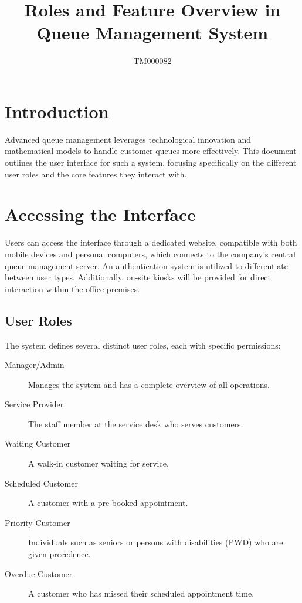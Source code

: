 \documentclass{article}
\title{Roles and Feature Overview in Queue Management System}
\author{TM000082}
\date{}
\begin{document}
\maketitle

\section{Introduction}

Advanced queue management leverages technological innovation and mathematical models to handle customer queues more effectively. This document outlines the user interface for such a system, focusing specifically on the different user roles and the core features they interact with.

\section{Accessing the Interface}

Users can access the interface through a dedicated website, compatible with both mobile devices and personal computers, which connects to the company's central queue management server. An authentication system is utilized to differentiate between user types. Additionally, on-site kiosks will be provided for direct interaction within the office premises.

\subsection{User Roles}

The system defines several distinct user roles, each with specific permissions:

\begin{description}
    \item[Manager/Admin] Manages the system and has a complete overview of all operations.
    \item[Service Provider] The staff member at the service desk who serves customers.
    \item[Waiting Customer] A walk-in customer waiting for service.
    \item[Scheduled Customer] A customer with a pre-booked appointment.
    \item[Priority Customer] Individuals such as seniors or persons with disabilities (PWD) who are given precedence.
    \item[Overdue Customer] A customer who has missed their scheduled appointment time.
\end{description}
\end{document}
